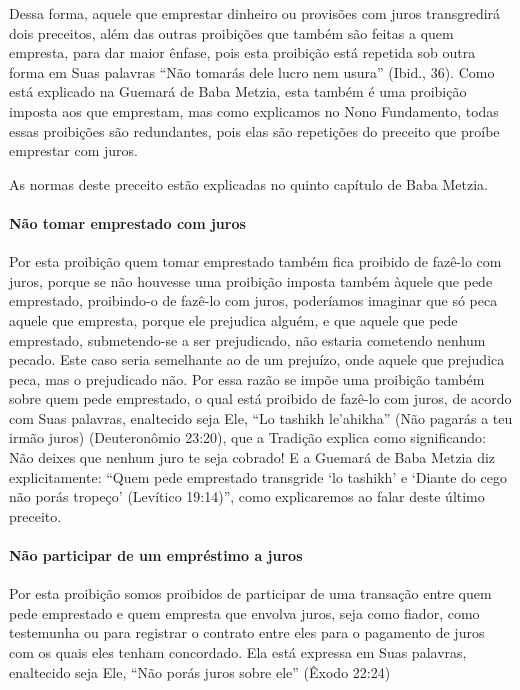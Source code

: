 Dessa forma, aquele que emprestar dinheiro ou provisões com juros
transgredirá dois preceitos, além das outras proibições que também são
feitas a quem empresta, para dar maior ênfase, pois esta proibição está
repetida sob outra forma em Suas palavras ``Não tomarás dele lucro nem
usura'' (Ibid., 36). Como está explicado na Guemará de Baba Metzia, esta
também é uma proibição imposta aos que emprestam, mas como explicamos
no Nono Fundamento, todas essas proibições são redundantes, pois elas
são repetições do preceito que proíbe emprestar com juros.

As normas deste preceito estão explicadas no quinto capítulo de Baba Metzia.

\paragraph{Não tomar emprestado com juros}

Por esta proibição quem tomar emprestado também fica proibido de fazê-lo
com juros, porque se não houvesse uma proibição imposta também àquele
que pede emprestado, proibindo-o de fazê-lo com juros, poderíamos
imaginar que só peca aquele que empresta, porque ele prejudica alguém, e
que aquele que pede emprestado, submetendo-se a ser prejudicado, não
estaria cometendo nenhum pecado. Este caso seria semelhante ao de um
prejuízo, onde aquele que prejudica peca, mas o prejudicado não. Por
essa razão se impõe uma proibição também sobre quem pede emprestado, o
qual está proibido de fazê-lo com juros, de acordo com Suas palavras,
enaltecido seja Ele, ``Lo tashikh le'ahikha'' (Não pagarás a teu irmão
juros) (Deuteronômio 23:20), que a Tradição explica como significando:
Não deixes que nenhum juro te seja cobrado! E a Guemará de Baba Metzia
diz explicitamente: ``Quem pede emprestado transgride `lo tashikh' e
`Diante do cego não porás tropeço' (Levítico 19:14)'', como explicaremos
ao falar deste último preceito.

\paragraph{Não participar de um empréstimo a juros}

Por esta proibição somos proibidos de participar de uma transação entre
quem pede emprestado e quem empresta que envolva juros, seja como
fiador, como testemunha ou para registrar o contrato entre eles para o
pagamento de juros com os quais eles tenham concordado. Ela está
expressa em Suas palavras, enaltecido seja Ele, ``Não porás juros sobre
ele'' (Êxodo 22:24)

